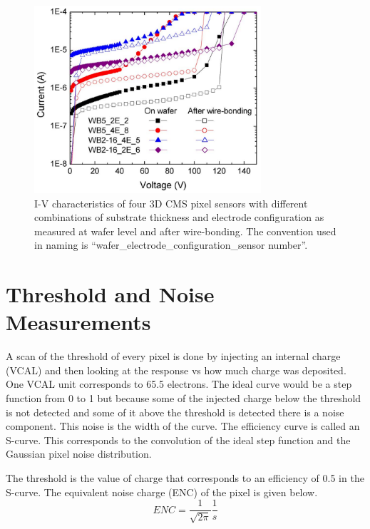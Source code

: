 \begin{figure}[htb!]
\begin{center}
\centerline{
\includegraphics[width=0.75\textwidth]{3D/IV_ba.pdf}
}
\caption{I-V characteristics of four 3D CMS pixel sensors with different combinations of substrate thickness and electrode configuration as measured at wafer level and after wire-bonding. The convention used in naming is “wafer\_electrode\_configuration\_sensor number”.~\cite{5734879} }
\label{fig:IV_ba}
\end{center}
\end{figure}


\section{Threshold and Noise Measurements}

A scan of the threshold of every pixel is done by injecting an internal charge (VCAL) and then looking at the response vs how much charge was deposited. One VCAL unit corresponds to 65.5 electrons. The ideal curve would be a step function from 0 to 1 but because some of the injected charge below the threshold is not detected and some of it above the threshold is detected there is a noise component. This noise is the width of the curve.  The efficiency curve is called an S-curve.  This corresponds to the convolution of the ideal step function and the Gaussian pixel noise distribution.

The threshold is the value of charge that corresponds to an efficiency of 0.5 in the S-curve.  The equivalent noise charge (ENC) of the pixel is given below.
\begin{equation} ENC = \dfrac{1}{\sqrt{2\pi}}\dfrac{1}{s} \end{equation}

